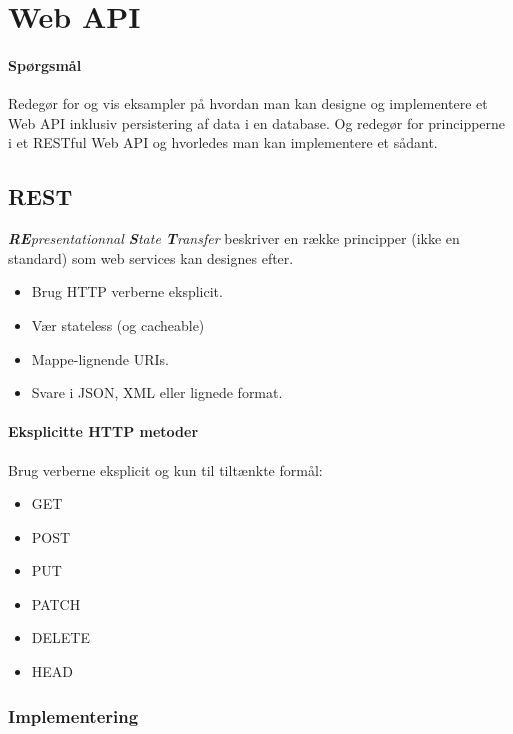 \section{Web API}

\paragraph{Spørgsmål}
Redegør for og vis eksampler på hvordan man kan designe	og implementere et Web API inklusiv persistering af data i en database.	Og redegør for principperne i et RESTful Web API og	hvorledes man kan implementere et sådant.

\subsection{REST}
\textit{\textbf{RE}presentationnal \textbf{S}tate \textbf{T}ransfer} beskriver en række principper (ikke en standard) som web services kan designes efter. 

\begin{itemize}
	\item Brug HTTP verberne eksplicit.
	\item Vær stateless (og cacheable)
	\item Mappe-lignende URIs.
	\item Svare i JSON, XML eller lignede format.
\end{itemize}

\paragraph{Eksplicitte HTTP metoder}
Brug verberne eksplicit og kun til tiltænkte formål: 

\begin{multicols}{2}
\begin{itemize}
	\item GET
	\item POST
	\item PUT
	\item PATCH
	\item DELETE
	\item HEAD
\end{itemize}
\end{multicols}

\subsubsection{Implementering}